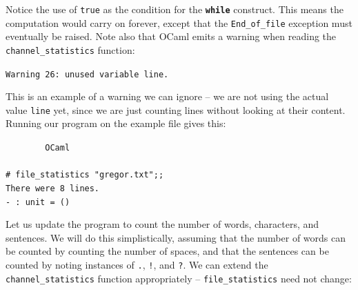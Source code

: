\documentclass[]{book}
\newcommand\upquote[1]{\textquotesingle#1\textquotesingle}
\newcommand{\smspace}{\vspace{4mm}}
\begin{document}
\noindent Notice the use of \texttt{true} as the condition for the \textbf{\texttt{while}} construct. This means the computation would carry on forever, except that the \texttt{End\_of\_file} exception must eventually be raised. Note also that OCaml emits  a warning when reading the \texttt{channel\_statistics} function:

\smspace
\texttt{Warning 26:\ unused variable line.}
\smspace

\noindent This is an example of a warning we can ignore -- we are not using the actual value \texttt{line} yet, since we are just counting lines without looking at their content. Running our program on the example file gives this:

\smspace
\noindent\verb!        OCaml!\\
\noindent\\
\noindent\verb!# file_statistics "gregor.txt";;!\\
\noindent\verb!There were 8 lines.!\\
\noindent\verb!- : unit = ()!
\smspace

\noindent Let us update the program to count the number of words, characters, and sentences. We will do this simplistically, assuming that the number of words can be counted by counting the number of spaces, and that the sentences can be counted by noting instances of \texttt{\upquote{.}}, \texttt{\upquote{!}}, and \texttt{\upquote{?}}. We can extend the \texttt{channel\_statistics} function appropriately -- \texttt{file\_statistics} need not change:
\end{document}
